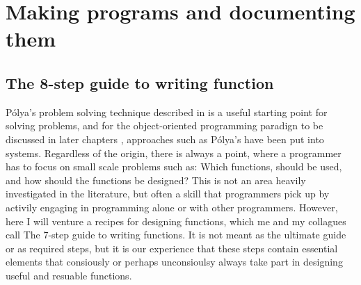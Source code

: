 \documentclass[fsharpNotes.tex]{subfiles}
\begin{document}
\chapter{Making programs and documenting them}


\section{The 8-step guide to writing function}
Pólya's problem solving technique described in  is a useful starting point for solving problems, and for the object-oriented programming paradign to be discussed in later chapters , approaches such as Pólya's have been put into systems. Regardless of the origin, there is always a point, where a programmer has to focus on small scale problems such as: Which functions, should be used, and how should the functions be designed? This is not an area heavily investigated in the literature, but often a skill that programmers pick up by activily engaging in programming alone or with other programmers. However, here I will venture a recipes for designing functions, which me and my collagues call The 7-step guide to writing functions. It is not meant as the ultimate guide or as required steps, but it is our experience that these steps contain essential elements that consiously or perhaps unconsioulsy always take part in designing useful and resuable functions.
\end{document}
